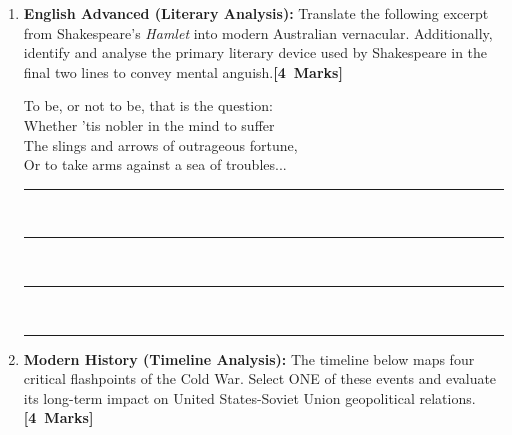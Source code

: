 \documentclass[11pt, a4paper]{article}
\begin{document}
\newpage



\begin{enumerate}[resume, label=\textbf{\arabic*.}, leftmargin=*]

\needspace{5cm}
\item \textbf{English Advanced (Literary Analysis):} Translate the following excerpt from Shakespeare's \textit{Hamlet} into modern Australian vernacular. Additionally, identify and analyse the primary literary device used by Shakespeare in the final two lines to convey mental anguish.\hfill\quad\mbox{\textbf{[4 Marks]}}

\vspace{0.2cm}
\begin{tcolorbox}[colback=gray!5, colframe=black, title=\textbf{William Shakespeare, \textit{Hamlet}}]
To be, or not to be, that is the question:\\
Whether 'tis nobler in the mind to suffer\\
The slings and arrows of outrageous fortune,\\
Or to take arms against a sea of troubles...
\end{tcolorbox}
\vspace{0.4cm} 

\noindent\rule{\linewidth}{0.4pt}\\[0.4cm]
\noindent\rule{\linewidth}{0.4pt}\\[0.4cm]
\noindent\rule{\linewidth}{0.4pt}\\[0.4cm]
\noindent\rule{\linewidth}{0.4pt}

\needspace{5cm}
\item \textbf{Modern History (Timeline Analysis):} The timeline below maps four critical flashpoints of the Cold War. Select ONE of these events and evaluate its long-term impact on United States-Soviet Union geopolitical relations.\hfill\quad\mbox{\textbf{[4 Marks]}}

\begin{center}
\end{center}


\end{enumerate}
\end{document}
